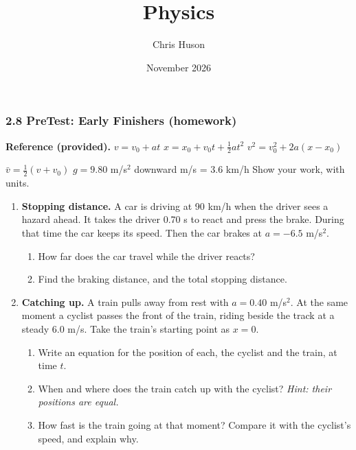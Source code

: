 \documentclass[12pt, twoside]{article}
\title{Physics}
\author{Chris Huson}
\date{November 2026}
\begin{document}
\subsubsection*{2.8 PreTest: Early Finishers (homework)}

\textbf{Reference (provided).} \quad $v = v_0 + at$ \quad
$x = x_0 + v_0 t + \frac{1}{2}at^2$ \quad $v^2 = v_0^2 + 2a(x - x_0)$

$\bar{v} = \frac{1}{2}(v + v_0)$ \quad $g = 9.80$ m/s$^2$ downward  m/s = 3.6 km/h \quad Show your work, with units.

\vspace{0.2cm}

\begin{enumerate}[itemsep=0.4cm, start=9]

\item \textbf{Stopping distance.} A car is driving at 90 km/h when the driver sees
  a hazard ahead. It takes the driver 0.70 s to react and press the brake. During
  that time the car keeps its speed. Then the car brakes at $a = -6.5$ m/s$^2$.
  \begin{enumerate}[itemsep=0.4cm]
    \item How far does the car travel while the driver reacts?
      \vspace{2.0cm}
    \item Find the braking distance, and the total stopping distance.
      \vspace{3.4cm}
  \end{enumerate}

\item \textbf{Catching up.} A train pulls away from rest with $a = 0.40$ m/s$^2$.
  At the same moment a cyclist passes the front of the train, riding beside the
  track at a steady 6.0 m/s. Take the train's starting point as $x = 0$.
  \begin{enumerate}[itemsep=0.4cm]
    \item Write an equation for the position of each, the cyclist and the train,
      at time $t$.
      \vspace{1.3cm}
    \item When and where does the train catch up with the cyclist? \emph{Hint:
      their positions are equal.}
      \vspace{2.5cm}
    \item How fast is the train going at that moment? Compare it with the
      cyclist's speed, and explain why.
  \end{enumerate}


\end{enumerate}
\end{document}
